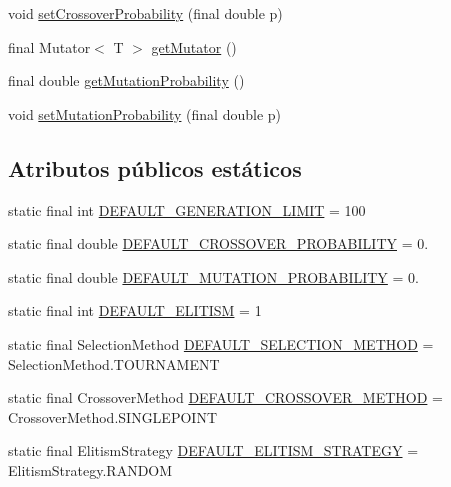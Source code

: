 \begin{DoxyCompactItemize}
\item 
void \hyperlink{classjenes_1_1algorithms_1_1_simple_g_a_3_01_t_01extends_01_chromosome_01_4_a639f43de8d71ae3e28077c4510eae64e}{set\-Crossover\-Probability} (final double p)
\item 
final Mutator$<$ T $>$ \hyperlink{classjenes_1_1algorithms_1_1_simple_g_a_3_01_t_01extends_01_chromosome_01_4_af1b77602d4f2440c2abde1f8a9d336e7}{get\-Mutator} ()
\item 
final double \hyperlink{classjenes_1_1algorithms_1_1_simple_g_a_3_01_t_01extends_01_chromosome_01_4_a0f8be347c9405a5b82d7a10678fc9a3a}{get\-Mutation\-Probability} ()
\item 
void \hyperlink{classjenes_1_1algorithms_1_1_simple_g_a_3_01_t_01extends_01_chromosome_01_4_a2ce1369d995dc328caa6b542e24e55f6}{set\-Mutation\-Probability} (final double p)
\end{DoxyCompactItemize}
\subsection*{Atributos públicos estáticos}
\begin{DoxyCompactItemize}
\item 
static final int \hyperlink{classjenes_1_1algorithms_1_1_simple_g_a_3_01_t_01extends_01_chromosome_01_4_ac4060f400a4a9d81185713c244699d40}{D\-E\-F\-A\-U\-L\-T\-\_\-\-G\-E\-N\-E\-R\-A\-T\-I\-O\-N\-\_\-\-L\-I\-M\-I\-T} = 100
\item 
static final double \hyperlink{classjenes_1_1algorithms_1_1_simple_g_a_3_01_t_01extends_01_chromosome_01_4_a6bb4783aa44abaae39375ae762412fa3}{D\-E\-F\-A\-U\-L\-T\-\_\-\-C\-R\-O\-S\-S\-O\-V\-E\-R\-\_\-\-P\-R\-O\-B\-A\-B\-I\-L\-I\-T\-Y} = 0.
\item 
static final double \hyperlink{classjenes_1_1algorithms_1_1_simple_g_a_3_01_t_01extends_01_chromosome_01_4_a6b93f23c518016295e31b02aa7ef1f8c}{D\-E\-F\-A\-U\-L\-T\-\_\-\-M\-U\-T\-A\-T\-I\-O\-N\-\_\-\-P\-R\-O\-B\-A\-B\-I\-L\-I\-T\-Y} = 0.
\item 
static final int \hyperlink{classjenes_1_1algorithms_1_1_simple_g_a_3_01_t_01extends_01_chromosome_01_4_a3b820957538efb558e8240e996d503cd}{D\-E\-F\-A\-U\-L\-T\-\_\-\-E\-L\-I\-T\-I\-S\-M} = 1
\item 
static final Selection\-Method \hyperlink{classjenes_1_1algorithms_1_1_simple_g_a_3_01_t_01extends_01_chromosome_01_4_a93d44174d00fdf0a8ebedfa3badcde66}{D\-E\-F\-A\-U\-L\-T\-\_\-\-S\-E\-L\-E\-C\-T\-I\-O\-N\-\_\-\-M\-E\-T\-H\-O\-D} = Selection\-Method.\-T\-O\-U\-R\-N\-A\-M\-E\-N\-T
\item 
static final Crossover\-Method \hyperlink{classjenes_1_1algorithms_1_1_simple_g_a_3_01_t_01extends_01_chromosome_01_4_a568bc71d97e1221ff4c7a4cc2b9a938d}{D\-E\-F\-A\-U\-L\-T\-\_\-\-C\-R\-O\-S\-S\-O\-V\-E\-R\-\_\-\-M\-E\-T\-H\-O\-D} = Crossover\-Method.\-S\-I\-N\-G\-L\-E\-P\-O\-I\-N\-T
\item 
static final Elitism\-Strategy \hyperlink{classjenes_1_1algorithms_1_1_simple_g_a_3_01_t_01extends_01_chromosome_01_4_ab95f26a5f33145a73eed2832becb962f}{D\-E\-F\-A\-U\-L\-T\-\_\-\-E\-L\-I\-T\-I\-S\-M\-\_\-\-S\-T\-R\-A\-T\-E\-G\-Y} = Elitism\-Strategy.\-R\-A\-N\-D\-O\-M
\end{DoxyCompactItemize}


